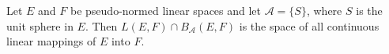 Let $E$ and $F$ be pseudo-normed linear spaces and let $\mathcal{A} = \{S\}$, where $S$ is the unit sphere in $E$. Then $L(E, F) \cap B_{\mathcal{A}}(E, F)$ is the space of all continuous linear mappings of $E$ into $F$.
